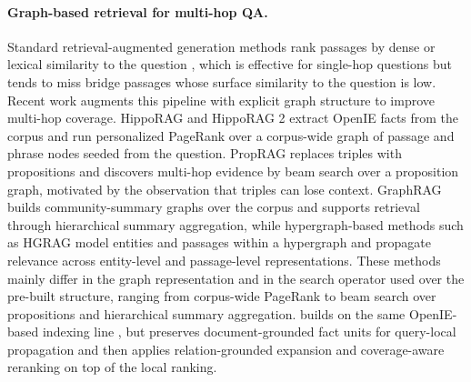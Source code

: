 \paragraph{Graph-based retrieval for multi-hop QA.}
Standard retrieval-augmented generation methods rank passages by dense
or lexical similarity to the question
\citep{karpukhin2020dpr,robertson2009bm25}, which is effective for
single-hop questions but tends to miss bridge passages whose surface
similarity to the question is low. Recent work augments this pipeline
with explicit graph structure to improve multi-hop coverage.
HippoRAG \citep{jimenez2024hipporag} and HippoRAG 2
\citep{gutierrez2025hipporag} extract OpenIE facts from the corpus and
run personalized PageRank over a corpus-wide graph of passage and
phrase nodes seeded from the question. PropRAG \citep{wang2025proprag}
replaces triples with propositions and discovers multi-hop evidence by
beam search over a proposition graph, motivated by the observation that
triples can lose context. GraphRAG \citep{edge2024graphrag} builds
community-summary graphs over the corpus and supports retrieval through
hierarchical summary aggregation, while hypergraph-based methods such
as HGRAG \citep{hgrag2024} model entities and passages within a
hypergraph and propagate relevance across entity-level and
passage-level representations. These methods mainly differ in the graph
representation and in the search operator used over the pre-built
structure, ranging from corpus-wide PageRank to beam search over
propositions and hierarchical summary aggregation. \methodname{} builds
on the same OpenIE-based indexing line
\citep{angeli2015leveraging,gutierrez2025hipporag}, but preserves
document-grounded fact units for query-local propagation and then
applies relation-grounded expansion and coverage-aware reranking on top
of the local ranking.

